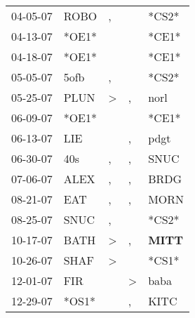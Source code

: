 \begin{supertabular}{p{0.07\textwidth}p{0.06\textwidth}p{0.02\textwidth}p{0.02\textwidth}p{0.06\textwidth}}
 04-05-07\textsuperscript{} &           ROBO\textsuperscript{} &                , &               &                            *CS2* \\
 04-13-07\textsuperscript{} &                            *OE1* &                  &               &                            *CE1* \\
 04-18-07\textsuperscript{} &                            *OE1* &                  &               &                            *CE1* \\
 05-05-07\textsuperscript{} &           5ofb\textsuperscript{} &                , &               &                            *CS2* \\
 05-25-07\textsuperscript{} &           PLUN\textsuperscript{} &     \textgreater &             , &           norl\textsuperscript{} \\
 06-09-07\textsuperscript{} &                            *OE1* &                  &               &                            *CE1* \\
 06-13-07\textsuperscript{} &            LIE\textsuperscript{} &                  &             , &           pdgt\textsuperscript{} \\
 06-30-07\textsuperscript{} &            40s\textsuperscript{} &                , &             , &           SNUC\textsuperscript{} \\
 07-06-07\textsuperscript{} &           ALEX\textsuperscript{} &                , &             , &           BRDG\textsuperscript{} \\
 08-21-07\textsuperscript{} &            EAT\textsuperscript{} &                , &             , &           MORN\textsuperscript{} \\
 08-25-07\textsuperscript{} &           SNUC\textsuperscript{} &                , &               &                            *CS2* \\
 10-17-07\textsuperscript{} &           BATH\textsuperscript{} &     \textgreater &             , &  \textbf{MITT\textsuperscript{}} \\
 10-26-07\textsuperscript{} &           SHAF\textsuperscript{} &     \textgreater &               &                            *CS1* \\
 12-01-07\textsuperscript{} &            FIR\textsuperscript{} &                  &  \textgreater &           baba\textsuperscript{} \\
 12-29-07\textsuperscript{} &                            *OS1* &                  &             , &           KITC\textsuperscript{} \\

\end{supertabular}
